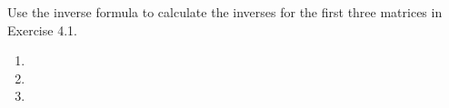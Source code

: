 Use the inverse formula to calculate the inverses for the first three matrices in Exercise 4.1.

\begin{enumerate}
    \item 
    \item 
    \item 
\end{enumerate}
